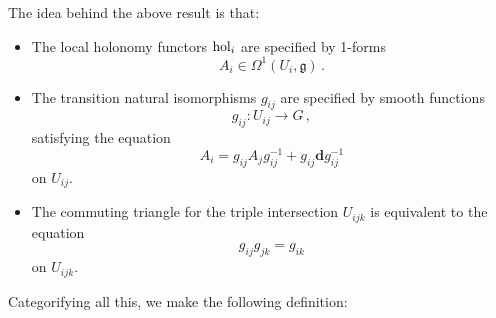 \documentclass{article}
\newcommand{\maps}{\colon}
\newcommand{\g}{\mathfrak{g}}
\def\hol {{\rm hol}}
\def\of #1{\!\left({#1}\right)}
\def\extd {\mathbf{{d}}}
\begin{document}
The idea behind the above result is that:

  \begin{itemize}
    \item
      The local holonomy functors $\hol_i$ are specified by
      1-forms 
      \[
        A_i \in \Omega^1\of{U_i,\g}\,.
      \]
    \item
      The transition natural isomorphisms $g_{ij}$ 
      are specified by smooth functions
      \[
        g_{ij} \maps U_{ij} \to G\,,
      \] 
      satisfying the equation
      \[
        A_i = g_{ij}A_j g_{ij}^{-1} + g_{ij} \extd g_{ij}^{-1}
      \]
      on $U_{ij}$.
   \item
    The commuting triangle for the triple intersection
    $U_{ijk}$ is equivalent to the equation
    \[
     g_{ij}g_{jk} = g_{ik} 
    \]
     on $U_{ijk}$.
  \end{itemize}

Categorifying all this, we make the following definition:
\end{document}
